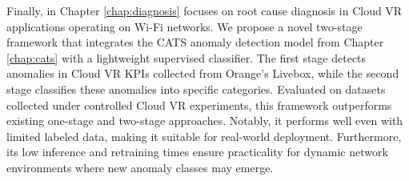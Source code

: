 Finally, in Chapter \ref{chap:diagnosis} focuses on root cause diagnosis in Cloud VR applications operating on Wi-Fi networks. We propose a novel two-stage framework that integrates the CATS anomaly detection model from Chapter \ref{chap:cats} with a lightweight supervised classifier. The first stage detects anomalies in Cloud VR KPIs collected from Orange's Livebox, while the second stage classifies these anomalies into specific categories.  Evaluated on datasets collected under controlled Cloud VR experiments, this framework outperforms existing one-stage and two-stage approaches. Notably, it performs well even with limited labeled data, making it suitable for real-world deployment. Furthermore, its low inference and retraining times ensure practicality for dynamic network environments where new anomaly classes may emerge.






